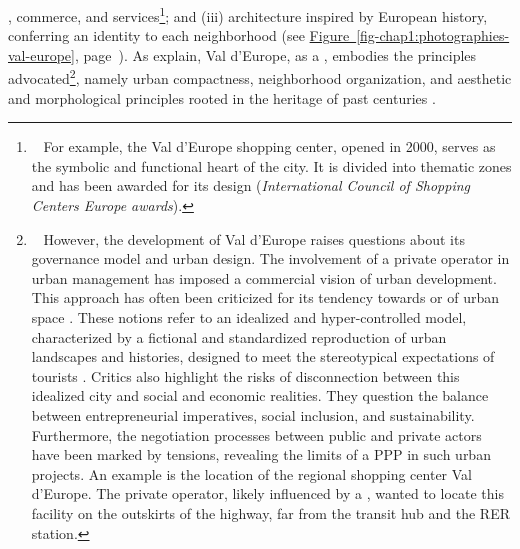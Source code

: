 \begin{refsegment}
{}, commerce, and services\footnote{~
    For example, the Val d'Europe shopping center, opened in 2000, serves as the symbolic and functional heart of the city. It is divided into thematic zones and has been awarded for its design (\textsl{International Council of Shopping Centers Europe awards}).
}; and (iii) architecture inspired by European history, conferring an identity to each neighborhood (see \hyperref[fig-chap1:photographies-val-europe]{Figure~\ref{fig-chap1:photographies-val-europe}}, page~\pageref{fig-chap1:photographies-val-europe}). As \textcolor{blue}{\textcite[25]{dupuis_nouvelle_2017}} explain, Val d'Europe, as a , embodies the principles advocated\footnote{~
    However, the development of Val d'Europe raises questions about its governance model and urban design. The involvement of a private operator in urban management has imposed a commercial vision of urban development. This approach has often been criticized for its tendency towards  or  of urban space \textcolor{blue}{\autocite[]{brunel_planete_2012}}. These notions refer to an idealized and hyper-controlled model, characterized by a fictional and standardized reproduction of urban landscapes and histories, designed to meet the stereotypical expectations of tourists \textcolor{blue}{\autocite[7]{claude_developpement_2021}}. Critics also highlight the risks of disconnection between this idealized city and social and economic realities. They question the balance between entrepreneurial imperatives, social inclusion, and sustainability. Furthermore, the negotiation processes between public and private actors have been marked by tensions, revealing the limits of a \acrshort{PPP} in such urban projects. An example is the location of the regional shopping center Val d'Europe. The private operator, likely influenced by a  \textcolor{blue}{\autocite[656]{tan_identifying_2014}}, wanted to locate this facility on the outskirts of the highway, far from the transit hub and the \acrshort{RER} station.
}, namely urban compactness, neighborhood organization, and aesthetic and morphological principles rooted in the heritage of past centuries \textcolor{blue}{\autocite[12]{moinse_exploring_2023}}.%


\end{refsegment}
